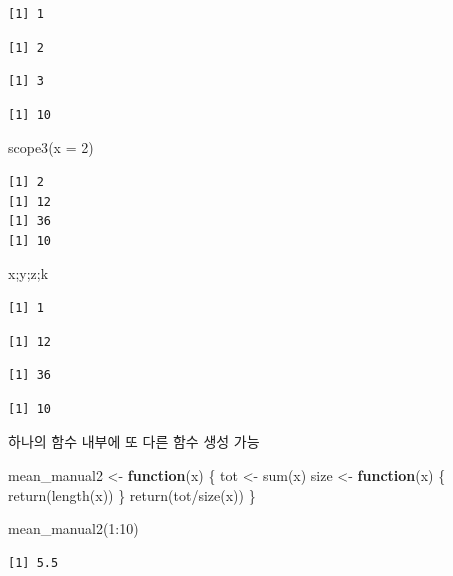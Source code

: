 \documentclass[
  11pt,
]{krantz}
\newenvironment{Shaded}{\begin{snugshade}}{\end{snugshade}}
\newcommand{\AttributeTok}[1]{\textcolor[rgb]{0.61,0.61,0.61}{#1}}
\newcommand{\ControlFlowTok}[1]{\textcolor[rgb]{0.27,0.27,0.27}{\textbf{#1}}}
\newcommand{\DecValTok}[1]{\textcolor[rgb]{0.06,0.06,0.06}{#1}}
\newcommand{\FunctionTok}[1]{\textcolor[rgb]{0,0,0}{#1}}
\newcommand{\NormalTok}[1]{#1}
\newcommand{\OtherTok}[1]{\textcolor[rgb]{0.37,0.37,0.37}{#1}}
\newcommand{\SpecialCharTok}[1]{\textcolor[rgb]{0,0,0}{#1}}
\begin{document}
\begin{verbatim}
[1] 1
\end{verbatim}

\begin{verbatim}
[1] 2
\end{verbatim}

\begin{verbatim}
[1] 3
\end{verbatim}

\begin{verbatim}
[1] 10
\end{verbatim}

\begin{Shaded}
\begin{Highlighting}[]
\FunctionTok{scope3}\NormalTok{(}\AttributeTok{x =} \DecValTok{2}\NormalTok{)}
\end{Highlighting}
\end{Shaded}

\begin{verbatim}
[1] 2
[1] 12
[1] 36
[1] 10
\end{verbatim}

\begin{Shaded}
\begin{Highlighting}[]
\NormalTok{x;y;z;k}
\end{Highlighting}
\end{Shaded}

\begin{verbatim}
[1] 1
\end{verbatim}

\begin{verbatim}
[1] 12
\end{verbatim}

\begin{verbatim}
[1] 36
\end{verbatim}

\begin{verbatim}
[1] 10
\end{verbatim}

\normalsize

하나의 함수 내부에 또 다른 함수 생성 가능

\footnotesize

\begin{Shaded}
\begin{Highlighting}[]
\NormalTok{mean\_manual2 }\OtherTok{\textless{}{-}} \ControlFlowTok{function}\NormalTok{(x) \{}
\NormalTok{  tot }\OtherTok{\textless{}{-}} \FunctionTok{sum}\NormalTok{(x)}
\NormalTok{  size }\OtherTok{\textless{}{-}} \ControlFlowTok{function}\NormalTok{(x) \{}
    \FunctionTok{return}\NormalTok{(}\FunctionTok{length}\NormalTok{(x))}
\NormalTok{  \}}
  \FunctionTok{return}\NormalTok{(tot}\SpecialCharTok{/}\FunctionTok{size}\NormalTok{(x))}
\NormalTok{\}}

\FunctionTok{mean\_manual2}\NormalTok{(}\DecValTok{1}\SpecialCharTok{:}\DecValTok{10}\NormalTok{)}
\end{Highlighting}
\end{Shaded}

\begin{verbatim}
[1] 5.5
\end{verbatim}

\normalsize

  

\printindex
\end{document}
